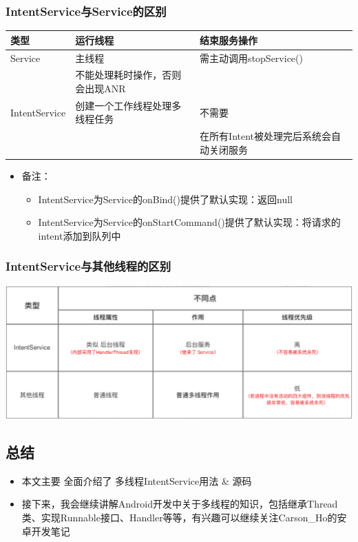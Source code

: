 \documentclass[9pt, b5paper]{article}
\begin{document}
\subsubsection{IntentService与Service的区别}
\label{sec-4-10-1}
\begin{center}
\begin{tabular}{lll}
\hline
类型 & 运行线程 & 结束服务操作\\
\hline
Service & 主线程 & 需主动调用stopService()\\
 & 不能处理耗时操作，否则会出现ANR & \\
\hline
IntentService & 创建一个工作线程处理多线程任务 & 不需要\\
 &  & 在所有Intent被处理完后系统会自动关闭服务\\
\hline
\end{tabular}
\end{center}

\begin{itemize}
\item 备注：
\begin{itemize}
\item IntentService为Service的onBind()提供了默认实现：返回null
\item IntentService为Service的onStartCommand()提供了默认实现：将请求的intent添加到队列中
\end{itemize}
\end{itemize}
\subsubsection{IntentService与其他线程的区别}
\label{sec-4-10-2}

\includegraphics[width=.9\linewidth]{./pic/serviceIntentService.png}

\subsection{总结}
\label{sec-4-11}
\begin{itemize}
\item 本文主要 全面介绍了 多线程IntentService用法 \& 源码
\item 接下来，我会继续讲解Android开发中关于多线程的知识，包括继承Thread类、实现Runnable接口、Handler等等，有兴趣可以继续关注Carson\_Ho的安卓开发笔记
\end{itemize}
\end{document}
